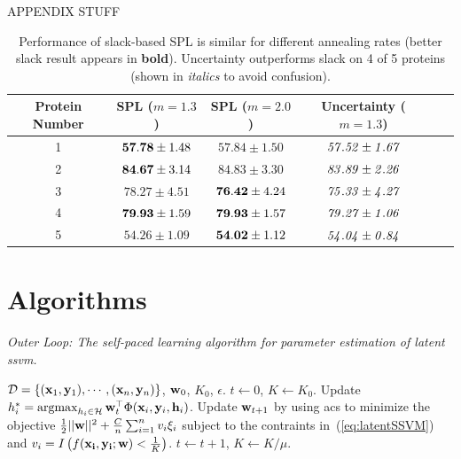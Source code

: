 \documentclass{article}
\newcommand{\mysection}[1]{\vspace{-4mm}\section{#1}\vspace{-4mm}}
\newcommand{\mytopcaption}[1]{\caption{\em \footnotesize #1}}
\newcommand{\argmax}{\operatornamewithlimits{argmax}}
\begin{document}
APPENDIX STUFF

\begin{table}
\caption{Performance of slack-based SPL is similar for different annealing rates (better slack result appears in \textbf{bold}).  Uncertainty outperforms slack on 4 of 5 proteins (shown in \emph{italics} to avoid confusion).}
\begin{center}
\begin{tabular}{|c|c|c|c|c|c|}
\hline Protein Number  & SPL ($m=1.3$) & SPL ($m=2.0$) & Uncertainty ($m=1.3$) \\\hline
1 & ${\bf57.78} \pm 1.48$ & $57.84 \pm 1.50$ & $\it{57.52 \pm 1.67}$ \\ \hline
2 & ${\bf84.67} \pm 3.14$ & $84.83 \pm 3.30$ & $\it{83.89 \pm 2.26}$ \\ \hline
3 & $78.27 \pm 4.51$ & ${\bf76.42} \pm 4.24$ & $\it{75.33 \pm 4.27}$ \\ \hline
4 & ${\bf79.93} \pm 1.59$ & ${\bf79.93} \pm 1.57$ & $\it{79.27 \pm 1.06}$ \\ \hline
5 & $54.26 \pm 1.09$ & ${\bf54.02} \pm 1.12$ & $\it{54.04 \pm 0.84}$ \\ \hline
\end{tabular}
\end{center}
\label{tbl:faster}
\end{table}

\appendix
\mysection{Algorithms}
\label{sec:algs}

\begin{algorithm}[h!]
\mytopcaption{Outer Loop: The self-paced learning algorithm for parameter estimation of latent {\sc ssvm}.}
\label{algo:selfPacedLatentSSVM}
\begin{algorithmic}[1]
\INPUT ${\cal D} = \{({\bf x}_1,{\bf y}_1),\cdots,({\bf x}_n,{\bf y}_n)\}$, ${\bf w}_0$, $K_0$, $\epsilon$.
\STATE $t \leftarrow 0$, $K \leftarrow K_0$.
\REPEAT
\STATE Update $h_i^* = \argmax_{h_i \in {\cal H}} {\bf w}_{t}^\top \Phi({\bf x}_i,{\bf y}_i,{\bf h}_i)$.
\STATE Update ${\bf w}_{t+1}$ by using {\sc acs} to minimize the objective
$\frac{1}{2}||{\bf w}||^2 + \frac{C}{n} \sum_{i=1}^n v_i\xi_i$ subject to the contraints in~(\ref{eq:latentSSVM}) and $v_i=I\left(f({\bf x_i,\bf y_i;\bf w}) < \frac{1}{K}\right)$.
\STATE $t \leftarrow t + 1$, $K \leftarrow K/\mu$.
\end{algorithmic}
\end{algorithm}
\end{document}
